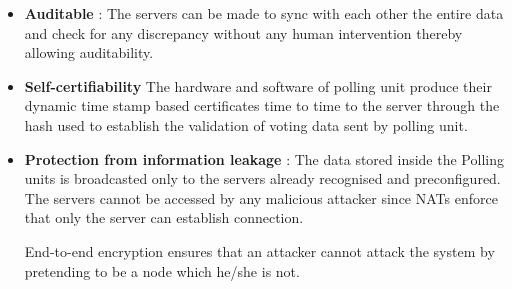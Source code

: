 \documentclass[a4paper,12pt,openany]{book}
\begin{document}
\begin{itemize}
\item \textbf{Auditable} :
The servers can be made to sync with each other the entire data and check for any discrepancy without any human intervention thereby allowing auditability.

\item \textbf{Self-certifiability}
The hardware and software of polling unit produce their dynamic time stamp based certificates time to time to the server through the hash used to establish the validation of voting data sent by polling unit.

\item \textbf{Protection from information leakage} :
The data stored inside the Polling units is broadcasted only to the servers already recognised and preconfigured. The servers cannot be accessed by any malicious attacker since NATs enforce that only the server can establish connection.

End-to-end encryption ensures that an attacker cannot attack the system by pretending to be a node which he/she is not.

\end{itemize}
\end{document}
